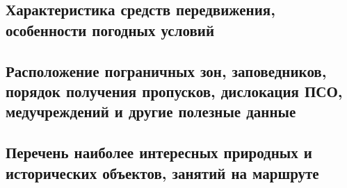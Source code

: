 \subsection{Характеристика средств передвижения, особенности погодных условий}

\subsection{Расположение пограничных зон, заповедников, порядок получения пропусков, дислокация ПСО, медучреждений и другие полезные данные}

\subsection{Перечень наиболее интересных природных и исторических объектов, занятий на маршруте}
\newpage